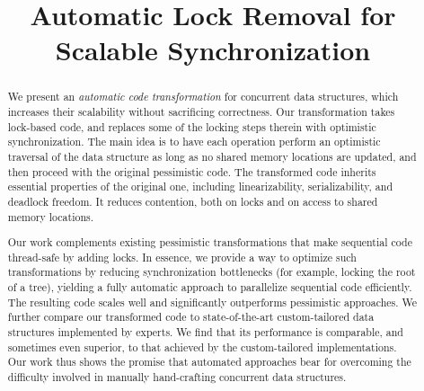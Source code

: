 \documentclass[pldi]{sigplanconf-pldi15}
\newcommand{\doi}[1]{doi:~\href{http://dx.doi.org/#1}{\Hurl{#1}}}   %
\begin{document}
%
%
%
%
%
%


\title{Automatic Lock Removal for Scalable Synchronization}
%

\maketitle

\begin{abstract}
We present an \emph{automatic code transformation} for concurrent data structures, 
which increases their scalability without sacrificing correctness. 
Our transformation takes lock-based code, and replaces some of the 
locking steps therein with optimistic synchronization. The main idea is to
have each operation perform an optimistic traversal of the data structure 
as long as no shared memory locations are updated, and then proceed with
the original pessimistic code. The transformed code inherits essential 
properties of the original one, including linearizability, serializability,
and deadlock freedom. It reduces contention, both on locks and on access
to shared memory locations. 

Our work complements existing pessimistic transformations that make
sequential code thread-safe by adding locks.
In essence, we provide a way to optimize such transformations by reducing 
synchronization bottlenecks (for example, locking the root of a tree), 
yielding a fully automatic approach to parallelize sequential code efficiently. 
The resulting code scales well and significantly outperforms
pessimistic approaches. We further compare our transformed code to state-of-the-art 
custom-tailored data structures implemented by experts. 
We find that its performance is comparable, and sometimes even superior, 
to that achieved by the custom-tailored implementations.
Our work thus shows the promise that automated approaches
bear for overcoming the difficulty involved in manually
hand-crafting concurrent data structures.

\end{abstract}
\end{document}
